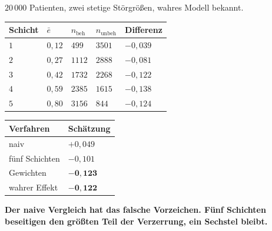 \begin{merksatz}
$20\,000$ Patienten, zwei stetige Störgrößen, wahres Modell bekannt.

\begin{center}
{\small
\renewcommand{\arraystretch}{1.46}
\begin{tabular}{@{}P{1.8cm}P{1.6cm}P{1.6cm}P{1.6cm}P{2.0cm}@{}}
\toprule
\textbf{Schicht} & $\bar e$ & $n_{\text{beh}}$ & $n_{\text{unbeh}}$ & \textbf{Differenz}\\
\midrule
$1$ & $0{,}12$ & $499$ & $3501$ & $-0{,}039$\\
$2$ & $0{,}27$ & $1112$ & $2888$ & $-0{,}081$\\
$3$ & $0{,}42$ & $1732$ & $2268$ & $-0{,}122$\\
$4$ & $0{,}59$ & $2385$ & $1615$ & $-0{,}138$\\
$5$ & $0{,}80$ & $3156$ & $844$ & $-0{,}124$\\
\bottomrule
\end{tabular}}
\end{center}

\begin{center}
{\small
\renewcommand{\arraystretch}{1.5}
\begin{tabular}{@{}P{3.0cm}P{2.4cm}@{}}
\toprule
\textbf{Verfahren} & \textbf{Schätzung}\\
\midrule
naiv & $+0{,}049$\\
fünf Schichten & $-0{,}101$\\
Gewichten & $\mathbf{-0{,}123}$\\
\midrule
wahrer Effekt & $\mathbf{-0{,}122}$\\
\bottomrule
\end{tabular}}
\end{center}

\begin{center}
\begin{minipage}{0.9\textwidth}
\textbf{Der naive Vergleich hat das falsche Vorzeichen. Fünf Schichten beseitigen den größten Teil der Verzerrung, ein Sechstel bleibt.}
\end{minipage}
\end{center}

\begin{center}
\begin{minipage}{0.88\textwidth}
\end{minipage}
\end{center}
\end{merksatz}

